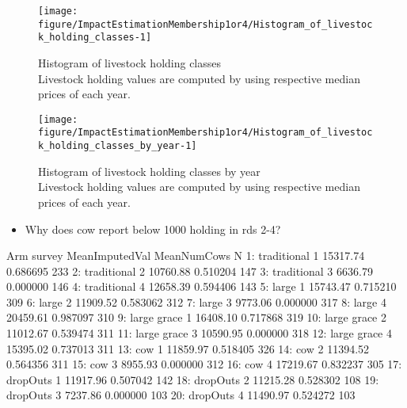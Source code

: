 \begin{Schunk}
\begin{figure}

{\centering \texttt{[image: figure/ImpactEstimationMembership1or4/Histogram\_of\_livestock\_holding\_classes-1]} 

}

\caption{Histogram of livestock holding classes\\ {\footnotesize Livestock holding values are computed by using respective median prices of each year.\setlength{\baselineskip}{8pt}}}\label{Figure Histogram of livestock holding classes}
\end{figure}
\end{Schunk}
\begin{Schunk}
\begin{figure}

{\centering \texttt{[image: figure/ImpactEstimationMembership1or4/Histogram\_of\_livestock\_holding\_classes\_by\_year-1]} 

}

\caption{Histogram of livestock holding classes by year\\ {\footnotesize Livestock holding values are computed by using respective median prices of each year.\setlength{\baselineskip}{8pt}}}\label{Figure Histogram of livestock holding classes by year}
\end{figure}
\end{Schunk}
\begin{itemize}
\vspace{1.0ex}\setlength{\itemsep}{1.0ex}\setlength{\baselineskip}{12pt}
\item	Why does \textsf{cow} report below 1000 holding in rds 2-4?
\end{itemize}
\begin{Schunk}
\begin{Soutput}
            Arm survey MeanImputedVal MeanNumCows   N
 1: traditional      1       15317.74    0.686695 233
 2: traditional      2       10760.88    0.510204 147
 3: traditional      3        6636.79    0.000000 146
 4: traditional      4       12658.39    0.594406 143
 5:       large      1       15743.47    0.715210 309
 6:       large      2       11909.52    0.583062 312
 7:       large      3        9773.06    0.000000 317
 8:       large      4       20459.61    0.987097 310
 9: large grace      1       16408.10    0.717868 319
10: large grace      2       11012.67    0.539474 311
11: large grace      3       10590.95    0.000000 318
12: large grace      4       15395.02    0.737013 311
13:         cow      1       11859.97    0.518405 326
14:         cow      2       11394.52    0.564356 311
15:         cow      3        8955.93    0.000000 312
16:         cow      4       17219.67    0.832237 305
17:    dropOuts      1       11917.96    0.507042 142
18:    dropOuts      2       11215.28    0.528302 108
19:    dropOuts      3        7237.86    0.000000 103
20:    dropOuts      4       11490.97    0.524272 103
\end{Soutput}
\end{Schunk}

